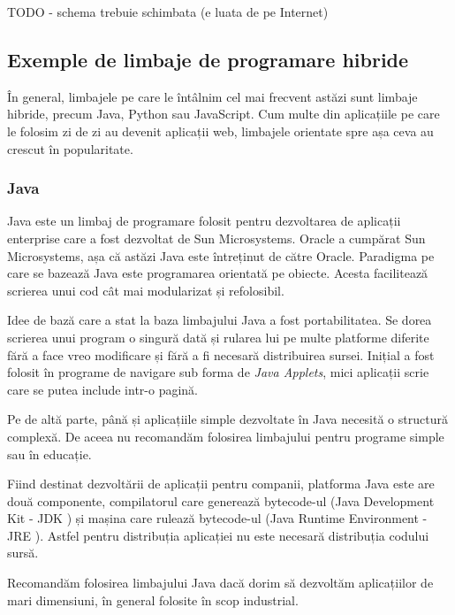 TODO - schema trebuie schimbata (e luata de pe Internet)

\subsection{Exemple de limbaje de programare hibride}
\label{sec:appdev-langs-hybrid-ex}

În general, limbajele pe care le întâlnim cel mai frecvent astăzi sunt limbaje
hibride, precum Java, Python sau JavaScript. Cum multe din aplicațiile pe care
le folosim zi de zi au devenit aplicații web, limbajele orientate spre așa ceva
au crescut în popularitate.

\subsubsection{Java}
\label{sec:appdev-langs-hybrid-ex-java}

Java este un limbaj de programare folosit pentru dezvoltarea de aplicații
enterprise care a fost dezvoltat de Sun Microsystems. Oracle a cumpărat Sun
Microsystems, așa că astăzi Java este întreținut de către Oracle. Paradigma pe
care se bazează Java este programarea orientată pe obiecte. Acesta facilitează
scrierea unui cod cât mai modularizat și refolosibil.

Idee de bază care a stat la baza limbajului Java a fost portabilitatea. Se dorea
scrierea unui program o singură dată și rularea lui pe multe platforme diferite
fără a face vreo modificare și fără a fi necesară distribuirea sursei. Inițial a
fost folosit în programe de navigare sub forma de \textit{Java Applets}, mici
aplicații scrie care se putea include intr-o pagină.

Pe de altă parte, până și aplicațiile simple dezvoltate în Java necesită o
structură complexă. De aceea nu recomandăm folosirea limbajului pentru programe
simple sau în educație.

Fiind destinat dezvoltării de aplicații pentru companii, platforma Java este are
două componente, compilatorul care generează bytecode-ul (Java Development Kit -
JDK ) și mașina care rulează bytecode-ul (Java
Runtime Environment - JRE ). Astfel pentru
distribuția aplicației nu este necesară distribuția codului sursă.

Recomandăm folosirea limbajului Java dacă dorim să dezvoltăm aplicațiilor de
mari dimensiuni, în general folosite în scop industrial.

